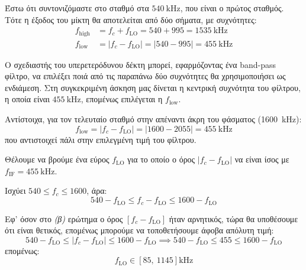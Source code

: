 \documentclass[11pt,a4paper,notitlepage,fleqn,final]{article}
\begin{document}
\begin{enumgreekparen}
	
	\item
	Έστω ότι συντονιζόμαστε στο σταθμό στα \( \SI{540}{\kilo\hertz} \), που είναι ο πρώτος σταθμός.
	Τότε η έξοδος του μίκτη θα αποτελείται από δύο σήματα, με συχνότητες:
	\begin{align*}
		f_{\mathrm{high}} &= f_c + f_{\mathrm{LO}} = 540+995 = \SI{1535}{\kilo\hertz}\\
		f_{\mathrm{low}} &=  \left| f_c - f_{\mathrm{LO}}\right|= |540-995| = \SI{455}{\kilo\hertz}
	\end{align*}
	
	Ο σχεδιαστής του υπερετερόδυνου δέκτη μπορεί, εφαρμόζοντας ένα band-pass φίλτρο, να επιλέξει ποιά από τις παραπάνω
	δύο συχνότητες θα χρησιμοποιήσει ως ενδιάμεση. Στη συγκεκριμένη άσκηση μας δίνεται η κεντρική συχνότητα του φίλτρου, η οποία είναι \( \SI{455}{\kilo\hertz} \), επομένως επιλέγεται η \(f_\mathrm{low}\).
	
	Αντίστοιχα, για τον τελευταίο σταθμό στην απέναντι άκρη του φάσματος (\SI{1600}{\kilo\hertz}):
	\[
	f_{\mathrm{low}} = \left| f_c - f_{\mathrm{LO}}\right|= |1600-2055| = \SI{455}{\kilo\hertz}
	\]
	που αντιστοιχεί πάλι στην επιλεγμένη τιμή του φίλτρου.
	
	\item
	Θέλουμε να βρούμε ένα εύρος \( f_{\mathrm{LO}} \) για το οποίο ο όρος \( |f_c-f_{\mathrm{LO}}| \) να είναι
	ίσος με \( f_{\mathrm{IF}} = \SI{455}{\kilo\hertz}  \).
	
	Ισχύει \( 540 \leq f_c \leq 1600 \), άρα:
	\[
	540-f_{\mathrm{LO}} \leq f_c - f_{\mathrm{LO}} \leq 1600 - f_{\mathrm{LO}}
	\]
	
	Εφ' όσον στο \textit{(β)} ερώτημα ο όρος \( \left[f_c - f_{\mathrm{LO}}\right] \) ήταν αρνητικός, τώρα θα υποθέσουμε
	ότι είναι θετικός, επομένως μπορούμε να τοποθετήσουμε άφοβα απόλυτη τιμή:
	\[
	540-f_{\mathrm{LO}} \leq \left|f_c - f_{\mathrm{LO}}\right| \leq 1600 - f_{\mathrm{LO}}
	\implies
	540-f_{\mathrm{LO}} \leq 455 \leq 1600 - f_{\mathrm{LO}}
	\]
	επομένως:
	\[
	f_{\mathrm{LO}} \in \left[
	85,\ 1145
	\right] \si{\kilo\hertz}
	\]
	

\end{enumgreekparen}
\end{document}
